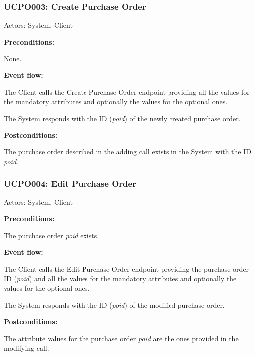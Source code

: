 \begin{ucbox}{\subsubsection{UCPO003: Create Purchase Order}}
\label{UCPO003}

Actors: System, Client

\textbf{Preconditions:}

\ucitem None.

\textbf{Event flow:}

\ucitem The Client calls the Create Purchase Order endpoint providing all the values for the mandatory attributes and optionally the values for the optional ones.

\ucitem The System responds with the ID (\textit{poid}) of the newly created purchase order.

\textbf{Postconditions:}

\ucitem The purchase order described in the adding call exists in the System with the ID \textit{poid}.

\end{ucbox}

\begin{ucbox}{\subsubsection{UCPO004: Edit Purchase Order}}
\label{UCPO004}

Actors: System, Client

\textbf{Preconditions:}

\ucitem The purchase order \textit{poid} exists.

\textbf{Event flow:}

\ucitem The Client calls the Edit Purchase Order endpoint providing the purchase order ID (\textit{poid}) and all the values for the mandatory attributes and optionally the values for the 
optional ones.

\ucitem The System responds with the ID (\textit{poid}) of the modified purchase order.

\textbf{Postconditions:}

\ucitem The attribute values for the purchase order \textit{poid} are the ones provided in the modifying call.

\end{ucbox}


